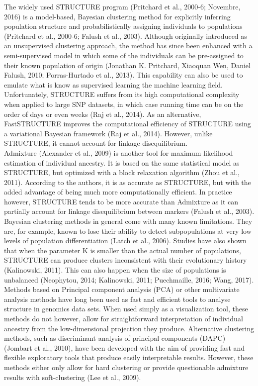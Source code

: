 \documentclass{bioinfo}
\begin{document}
The widely used STRUCTURE program (Pritchard et al., 2000-6; Novembre, 2016) is a model-based, Bayesian clustering method for explicitly inferring population structure and probabilistically assigning individuals to  populations (Pritchard et al., 2000-6; Falush et al., 2003). Although originally introduced as an unsupervised clustering approach, the method has since been enhanced with a semi-supervised model in which some of the individuals can be pre-assigned to their known population of origin (Jonathan K. Pritchard, Xiaoquan Wen, Daniel Falush, 2010; Porras-Hurtado et al., 2013). This capability can also be used to emulate what is know as supervised learning the machine learning field. Unfortunately, STRUCTURE suffers from its high computational complexity when applied to large SNP datasets, in which case running time can be on the order of days or even weeks (Raj et al., 2014). As an alternative, FastSTRUCTURE improves the computational efficiency of STRUCTURE using a variational Bayesian framework (Raj et al., 2014). However, unlike STRUCTURE, it cannot account for linkage disequilibrium.\\
Admixture (Alexander et al., 2009) is another tool for maximum likelihood estimation of individual ancestry. It is based on the same statistical model as STRUCTURE, but optimized with a block relaxation algorithm (Zhou et al., 2011). According to the authors, it is as accurate as STRUCTURE, but with the added advantage of being much more computationally efficient. In practice however, STRUCTURE tends to be more accurate than Admixture as it can partially account for linkage disequilibrium between markers (Falush et al., 2003).\\
Bayesian clustering methods in general come with many known limitations. They are, for example, known to lose their ability to detect subpopulations at very low levels of population differentiation (Latch et al., 2006). Studies have also shown that when the parameter K is smaller than the actual number of populations, STRUCTURE can produce clusters inconsistent with their evolutionary history (Kalinowski, 2011). This can also happen when the size of populations is unbalanced (Neophytou, 2014; Kalinowski, 2011; Puechmaille, 2016; Wang, 2017).\\
Methods based on Principal component analysis (PCA) or other multivariate analysis methods have long been used as fast and efficient tools to analyse structure in genomics data sets. When used simply as a visualization tool, these methods do not however, allow for straightforward interpretation of individual ancestry from the low-dimensional projection they produce. Alternative clustering methods, such as discriminant analysis of principal components (DAPC) (Jombart et al., 2010), have been developed with the aim of providing fast and flexible exploratory tools that produce easily interpretable results. However, these methods either only allow for hard clustering or provide questionable admixture results with soft-clustering (Lee et al., 2009).\\
\end{document}
